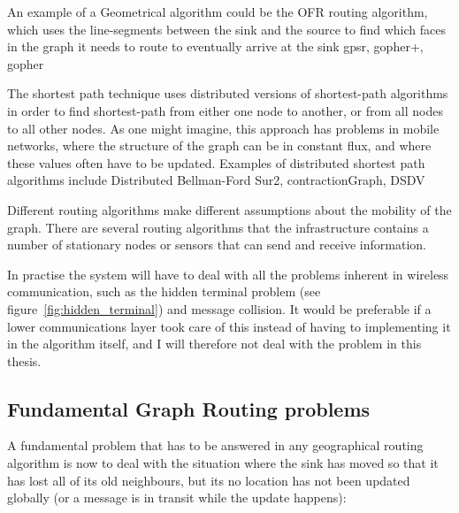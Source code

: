 \begin{description}
{An example of a Geometrical algorithm could be the OFR \cite{gopher} routing algorithm, which uses the line-segments between the sink and the source to find which faces in the graph it needs to route to eventually arrive at the sink}
{gpsr, gopher+, gopher}

      {The shortest path technique uses distributed versions of shortest-path algorithms in order to find shortest-path from either one node to another, or from all nodes to all other nodes. As one might imagine, this approach has problems in mobile networks, where the structure of the graph can be in constant flux, and where these values often have to be updated. Examples of distributed shortest path algorithms include Distributed Bellman-Ford}
{Sur2, contractionGraph, DSDV}
\end{description}

Different routing algorithms make different assumptions about the mobility of the graph. There are several routing algorithms \cite{adaptive, two-tier} that the infrastructure contains a number of stationary nodes or sensors that can send and receive information. 


In practise the system will have to deal with all the problems inherent in wireless communication, such as the hidden terminal problem (see figure~\ref{fig:hidden_terminal}) and message collision. It would be preferable if a lower communications layer took care of this instead of having to implementing it in the algorithm itself, and I will therefore not deal with the problem in this thesis.

\subsection{Fundamental Graph Routing problems}
A fundamental problem that has to be answered in any geographical routing algorithm is now to deal with the situation where the sink has moved so that it has lost all of its old neighbours, but its no location has not been updated globally (or a message is in transit while the update happens):

